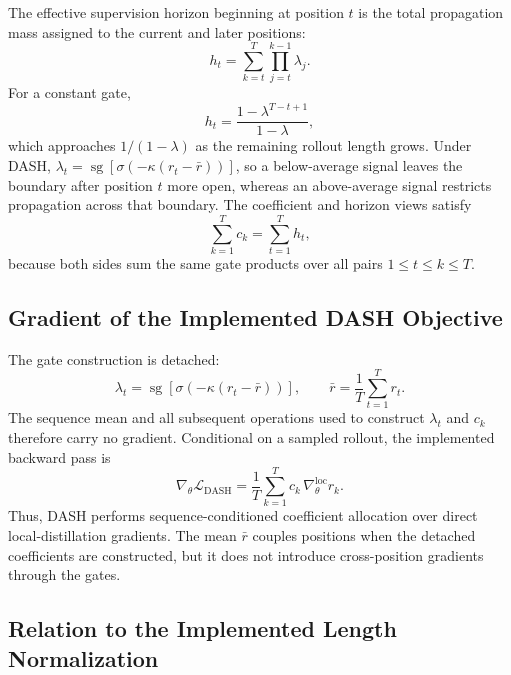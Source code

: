 \documentclass[letterpaper]{article} %
\begin{document}
The effective supervision horizon beginning at position $t$ is the
total propagation mass assigned to the current and later positions:
\begin{equation}
    h_t
    =
    \sum_{k=t}^{T}
    \prod_{j=t}^{k-1}\lambda_j.
    \label{eq:supp_effective_horizon}
\end{equation}
For a constant gate,
\begin{equation}
    h_t
    =
    \frac{1-\lambda^{T-t+1}}{1-\lambda},
\end{equation}
which approaches $1/(1-\lambda)$ as the remaining rollout length grows.
Under DASH, $\lambda_t=
\operatorname{sg}[\sigma(-\kappa(r_t-\bar r))]$, so a below-average
signal leaves the boundary after position $t$ more open, whereas an
above-average signal restricts propagation across that boundary. The
coefficient and horizon views satisfy
\begin{equation}
    \sum_{k=1}^{T}c_k
    =
    \sum_{t=1}^{T}h_t,
\end{equation}
because both sides sum the same gate products over all pairs
$1\leq t\leq k\leq T$.

\subsection{Gradient of the Implemented DASH Objective}
\label{app:dash_gradient}

The gate construction is detached:
\begin{equation}
    \lambda_t
    =
    \operatorname{sg}\!\left[
        \sigma\!\left(-\kappa(r_t-\bar r)\right)
    \right],
    \qquad
    \bar r=\frac{1}{T}\sum_{t=1}^{T}r_t.
\end{equation}
The sequence mean and all subsequent operations used to construct
$\lambda_t$ and $c_k$ therefore carry no gradient. Conditional on a
sampled rollout, the implemented backward pass is
\begin{equation}
    \nabla_\theta\mathcal L_{\mathrm{DASH}}
    =
    \frac{1}{T}\sum_{k=1}^{T}
    c_k\,\nabla_\theta^{\mathrm{loc}}r_k.
    \label{eq:supp_dash_gradient}
\end{equation}
Thus, DASH performs sequence-conditioned coefficient allocation over
direct local-distillation gradients. The mean $\bar r$ couples
positions when the detached coefficients are constructed, but it does
not introduce cross-position gradients through the gates.

\subsection{Relation to the Implemented Length Normalization}
\label{app:length_normalization}
\end{document}
